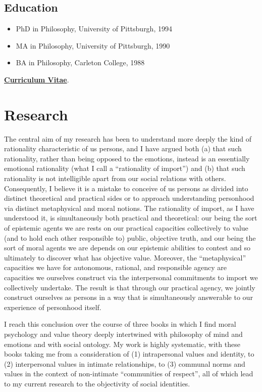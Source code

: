 \documentclass[%
  11pt,%
]{article}
\begin{document}
\subsection*{Education}

\begin{itemize}
  \item PhD in Philosophy, University of Pittsburgh, 1994
  \item MA in Philosophy, University of Pittsburgh, 1990
  \item BA in Philosophy, Carleton College, 1988
\end{itemize}

\noindent\href{https://drive.google.com/file/d/1-8fjo2F9EzgfDyYo_WSTYhaU-xrDNU8P/view}{\textbf{Curriculum Vitae}}.

\ifdefined\HCode
\fi

\section{Research}

The central aim of my research has been to understand more deeply the kind of rationality characteristic of us persons, and I have argued both (a) that such rationality, rather than being opposed to the emotions, instead is an essentially emotional rationality (what I call a \enquote{rationality of import}) and (b) that such rationality is not intelligible apart from our social relations with others. Consequently, I believe it is a mistake to conceive of us persons as divided into distinct theoretical and practical sides or to approach understanding personhood via distinct metaphysical and moral notions. The rationality of import, as I have understood it, is simultaneously both practical and theoretical: our being the sort of epistemic agents we are rests on our practical capacities collectively to value (and to hold each other responsible to) public, objective truth, and our being the sort of moral agents we are depends on our epistemic abilities to contest and so ultimately to discover what has objective value. Moreover, the \enquote{metaphysical} capacities we have for autonomous, rational, and responsible agency are capacities we ourselves construct via the interpersonal commitments to import we collectively undertake. The result is that through our practical agency, we jointly construct ourselves as persons in a way that is simultaneously answerable to our experience of personhood itself.

I reach this conclusion over the course of three books in which I find moral psychology and value theory deeply intertwined with philosophy of mind and emotions and with social ontology. My work is highly systematic, with these books taking me from a consideration of (1) intrapersonal values and identity, to (2) interpersonal values in intimate relationships, to (3) communal norms and values in the context of non-intimate \enquote{communities of respect}, all of which lead to my current research to the objectivity of social identities.
\end{document}
